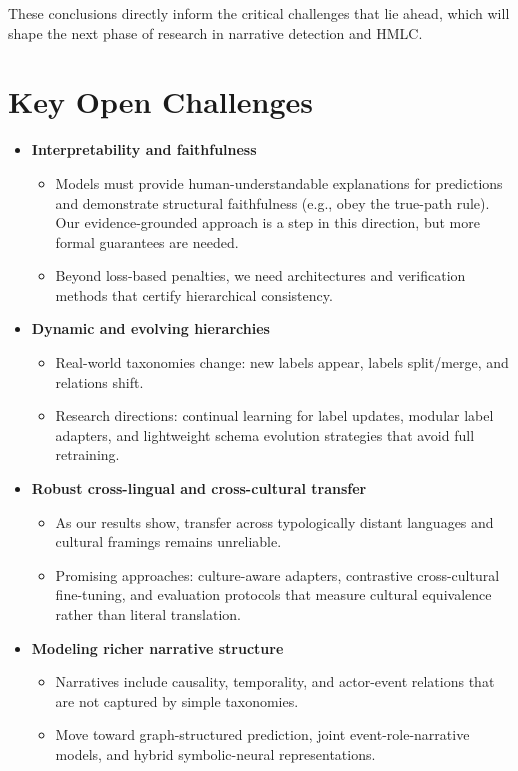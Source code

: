 These conclusions directly inform the critical challenges that lie ahead, which will shape the next phase of research in narrative detection and HMLC.

\section{Key Open Challenges}

\begin{itemize}
	\item \textbf{Interpretability and faithfulness}
		\begin{itemize}
			\item Models must provide human-understandable explanations for predictions and demonstrate structural faithfulness (e.g., obey the true-path rule). Our evidence-grounded approach is a step in this direction, but more formal guarantees are needed.
			\item Beyond loss-based penalties, we need architectures and verification methods that certify hierarchical consistency.
		\end{itemize}

	\item \textbf{Dynamic and evolving hierarchies}
		\begin{itemize}
			\item Real-world taxonomies change: new labels appear, labels split/merge, and relations shift.
			\item Research directions: continual learning for label updates, modular label adapters, and lightweight schema evolution strategies that avoid full retraining.
		\end{itemize}

	\item \textbf{Robust cross-lingual and cross-cultural transfer}
		\begin{itemize}
			\item As our results show, transfer across typologically distant languages and cultural framings remains unreliable.
			\item Promising approaches: culture-aware adapters, contrastive cross-cultural fine-tuning, and evaluation protocols that measure cultural equivalence rather than literal translation.
		\end{itemize}

	\item \textbf{Modeling richer narrative structure}
		\begin{itemize}
			\item Narratives include causality, temporality, and actor-event relations that are not captured by simple taxonomies.
			\item Move toward graph-structured prediction, joint event-role-narrative models, and hybrid symbolic-neural representations.
		\end{itemize}


\end{itemize}
